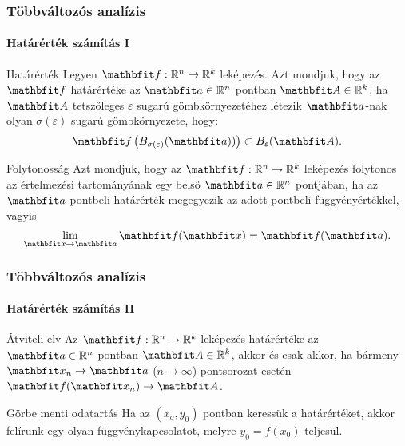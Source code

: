 \begin{frame}
  \frametitle{Többváltozós analízis}
  \framesubtitle{Határérték számítás I}

  \begin{block}{Határérték}
    Legyen $\rvec f: \mathbb R^n \rightarrow \mathbb R^k$ leképezés. Azt
    mondjuk, hogy az $\rvec f$ határértéke az $\rvec a \in \mathbb R^n$ pontban
    $\rvec A \in \mathbb R^k$, ha $\rvec A$ tetszőleges $\varepsilon$ sugarú
    gömbkörnyezetéhez létezik $\rvec a$-nak olyan $\sigma(\varepsilon)$ sugarú
    gömbkörnyezete, hogy:
    \[
      \rvec f \left(
      B_{\sigma(\varepsilon)}(\rvec a))
      \right)
      \subset
      B_\varepsilon(\rvec A)
      \text.
    \]
  \end{block}

  \begin{block}{Folytonosság}
    Azt mondjuk, hogy az $\rvec f: \mathbb R^n \rightarrow \mathbb R^k$
    leképezés folytonos az értelmezési tartományának egy belső $\rvec a \in
      \mathbb R^n$ pontjában, ha az $\rvec a$ pontbeli határérték megegyezik az
    adott pontbeli függvényértékkel, vagyis
    \[
      \lim_{\rvec x \rightarrow \rvec a} \rvec f(\rvec x) = \rvec f(\rvec a)
      \text.
    \]
  \end{block}
\end{frame}

\begin{frame}
  \frametitle{Többváltozós analízis}
  \framesubtitle{Határérték számítás II}

  \begin{block}{Átviteli elv}
    Az $\rvec f: \mathbb R^n \rightarrow \mathbb R^k$ leképezés határértéke az
    $\rvec a \in \mathbb R^n$ pontban $\rvec A \in \mathbb R^k$, akkor és csak
    akkor, ha bármeny $\rvec x_n \rightarrow \rvec a$ ($n \rightarrow \infty$)
    pontsorozat esetén $\rvec f (\rvec x_n) \rightarrow \rvec A$.
  \end{block}

  \begin{block}{Görbe menti odatartás}
    Ha az $(x_o, y_0)$ pontban keressük a határértéket, akkor felírunk egy
    olyan függvénykapcsolatot, melyre $y_0 = f(x_0)$ teljesül.
  \end{block}
\end{frame}

